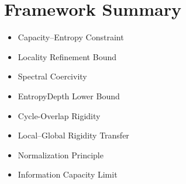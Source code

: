 \chapter{Framework Summary}



\begin{itemize}
\item Capacity--Entropy Constraint
\item Locality Refinement Bound
\item Spectral Coercivity
\item EntropyDepth Lower Bound
\item Cycle-Overlap Rigidity
\item Local--Global Rigidity Transfer
\item Normalization Principle
\item Information Capacity Limit
\end{itemize}
